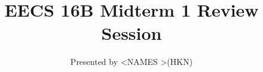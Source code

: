 

\title{EECS 16B Midterm 1 Review Session}
\author{Presented by \textless NAMES \textgreater (HKN)}
\date{}

\newcommand{\SlideAccessingLogistics}{@\#}










